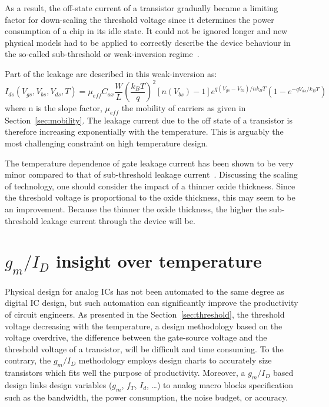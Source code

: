As a result, the off-state current of a transistor gradually became a limiting factor for down-scaling the threshold voltage since it determines the power consumption of a chip in its idle state. It could not be ignored longer and new physical models had to be applied to correctly describe the device behaviour in the so-called sub-threshold or weak-inversion regime~\cite{Cheng21997,Enz1995,Joardar1998}.

Part of the leakage are described in this weak-inversion as:
\begin{equation}
\label{eqn:ids_leakage}
I_{ds}(V_{gs}, V_{bs}, V_{ds}, T) = \mu_{eff} C_{ox} \frac{W}{L} {\left(\frac{k_B T}{q}\right)}^2 [n(V_{bs})-1] e^{q(V_{gs}-V_{th})/nk_B T} \left(1-e^{-qV_{ds}/k_B T} \right)
\end{equation}
where n is the slope factor, \(\mu_{eff} \) the mobility of carriers as given in Section~\ref{sec:mobility}. The leakage current due to the off state of a transistor is therefore increasing exponentially with the temperature. This is arguably the most challenging constraint on high temperature design.

The temperature dependence of gate leakage current has been shown to be very minor compared to that of sub-threshold leakage current~\cite{Agarwal2006}. Discussing the scaling of technology, one should consider the impact of a thinner oxide thickness. Since the threshold voltage is proportional to the oxide thickness, this may seem to be an improvement. Because the thinner the oxide thickness, the higher the sub-threshold leakage current through the device will be.



\section{\(g_m/I_{D} \) insight over temperature} %
\label{sec:analog-insight}
Physical design for analog ICs has not been automated to the same degree
as digital IC design, but such automation can significantly improve the productivity of circuit engineers. As presented in the Section~\ref{sec:threshold}, the threshold voltage decreasing with the temperature,  a design methodology based on the voltage overdrive, the difference between the gate-source voltage and the threshold voltage of a transistor, will be difficult and time consuming. To the contrary, the \(g_m/I_{D} \) methodology employs design charts to accurately size transistors which fits well the purpose of productivity. Moreover, a \(g_m/I_{D} \)  based design links design variables (\(g_m \), \(f_T \), \(I_d \), \ldots) to analog macro blocks specification such as the bandwidth, the power consumption, the noise budget, or accuracy.

